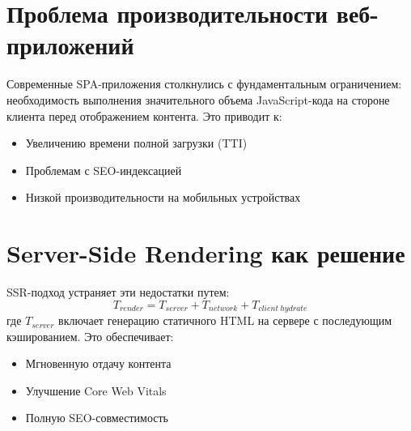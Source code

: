 \section{Проблема производительности веб-приложений}
Современные SPA-приложения столкнулись с фундаментальным ограничением: необходимость выполнения значительного объема JavaScript-кода на стороне клиента перед отображением контента. Это приводит к:
\begin{itemize}
    \item Увеличению времени полной загрузки (TTI)
    \item Проблемам с SEO-индексацией
    \item Низкой производительности на мобильных устройствах
\end{itemize}

\section{Server-Side Rendering как решение}
SSR-подход устраняет эти недостатки путем:
\begin{equation}
T_{render} = T_{server} + T_{network} + T_{client\ hydrate}
\end{equation}
где \(T_{server}\) включает генерацию статичного HTML на сервере с последующим кэшированием. Это обеспечивает:
\begin{itemize}
    \item Мгновенную отдачу контента
    \item Улучшение Core Web Vitals
    \item Полную SEO-совместимость
\end{itemize}
